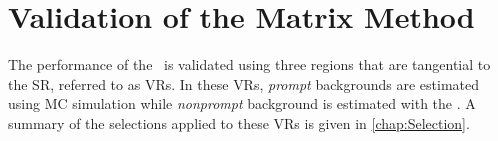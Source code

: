 \begin{table}[th]
\sffamily
\centering
{}
\caption{Summary of the cuts applied to the $r$/$f$ measurement region.}
\label{tab:MR}
\end{table}

\section{Validation of the Matrix Method}
\label{sec:MMVR}

The performance of the \mm~is validated using three regions that are tangential to the \ac{SR}, referred to as \acp{VR}. In these \acp{VR}, \emph{prompt} backgrounds are estimated using \ac{MC} simulation while \emph{nonprompt} background is estimated with the \mm. A summary of the selections applied to these VRs is given in \autoref{chap:Selection}. 

